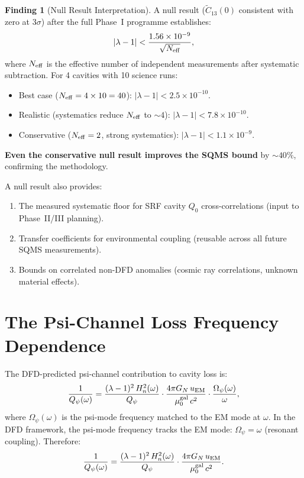 \documentclass[11pt]{article}
\newcommand{\lam}{\lambda}
\newcommand{\Opsi}{\Omega_\psi}
\newcommand{\ee}[1]{\times 10^{#1}}
\newcommand{\Qpsi}{Q_\psi}
\newcommand{\Heff}{H_n}
\newcommand{\muG}{\mu_0^{\rm gal}}
\newcommand{\lbone}{|\lam - 1|}
\newcommand{\GN}{G_N}
\theoremstyle{definition}
\newtheorem{finding}[theorem]{Finding}
\theoremstyle{remark}
\begin{document}
\begin{finding}[Null Result Interpretation]
\label{find:null_result}
A null result ($\tilde{C}_{13}(0)$ consistent with zero at
$3\sigma$) after the full Phase~I programme establishes:
\begin{equation}
\lbone < \frac{1.56\ee{-9}}{\sqrt{N_{\rm eff}}},
\end{equation}
where $N_{\rm eff}$ is the effective number of independent
measurements after systematic subtraction. For 4 cavities with
10 science runs:
\begin{itemize}[nosep]
\item Best case ($N_{\rm eff} = 4\times 10 = 40$): $\lbone < 2.5\ee{-10}$.
\item Realistic (systematics reduce $N_{\rm eff}$ to $\sim 4$):
  $\lbone < 7.8\ee{-10}$.
\item Conservative ($N_{\rm eff} = 2$, strong systematics):
  $\lbone < 1.1\ee{-9}$.
\end{itemize}

\textbf{Even the conservative null result improves the SQMS bound}
by $\sim 40\%$, confirming the methodology.

A null result also provides:
\begin{enumerate}[nosep]
\item The measured systematic floor for SRF cavity $Q_0$
  cross-correlations (input to Phase~II/III planning).
\item Transfer coefficients for environmental coupling (reusable
  across all future SQMS measurements).
\item Bounds on correlated non-DFD anomalies (cosmic ray correlations,
  unknown material effects).
\end{enumerate}
\end{finding}

\section{The Psi-Channel Loss Frequency Dependence}
\label{sec:freq_dependence}

The DFD-predicted psi-channel contribution to cavity loss is:
\begin{equation}
\frac{1}{Q_\psi(\omega)} = \frac{(\lam-1)^2\,\Heff^2(\omega)}{\Qpsi}
\cdot\frac{4\pi\GN\,u_{\rm EM}}{\muG\,c^2}
\cdot\frac{\Opsi(\omega)}{\omega},
\label{eq:psi_loss_freq}
\end{equation}
where $\Opsi(\omega)$ is the psi-mode frequency matched to the EM mode
at $\omega$. In the DFD framework, the psi-mode frequency tracks the EM
mode: $\Opsi = \omega$ (resonant coupling). Therefore:
\begin{equation}
\frac{1}{Q_\psi(\omega)} = \frac{(\lam-1)^2\,\Heff^2(\omega)}{\Qpsi}
\cdot\frac{4\pi\GN\,u_{\rm EM}}{\muG\,c^2}.
\end{equation}
\end{document}
